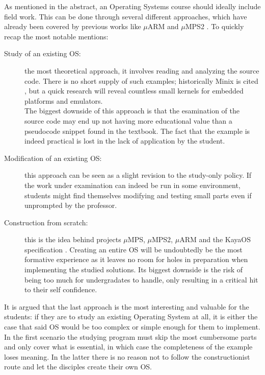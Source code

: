 \documentclass[12pt,a4paper,openright,twoside]{report}
\begin{document}
As mentioned in the abstract, an Operating Systems course should ideally include
field work. This can be done through several different approaches, which
have already been covered by previous works like $\mu$ARM and $\mu$MPS2
\cite{tesijonjic} \cite{tesimelletti}.
To quickly recap the most notable mentions:
\begin{description}
    \item[Study of an existing OS:] the most theoretical approach, it involves
        reading and analyzing the source code. There is no short supply of such
        examples; historically Minix is cited \cite{minix}, but a quick research
        will reveal countless small kernels for embedded platforms and emulators.\\
        The biggest downside of this approach is that the esamination of the source
        code may end up not having more educational value than a pseudocode snippet
        found in the textbook. The fact that the example is indeed practical is 
        lost in the lack of application by the student.
    \item[Modification of an existing OS:] this approach can be seen as a slight
        revision to the study-only policy. If the work under examination can indeed
        be run in some environment, students might find themselves modifying 
        and testing small parts even if unprompted by the professor.
    \item[Construction from scratch:] this is the idea behind projects $\mu$MPS, 
        $\mu$MPS2, $\mu$ARM and the KayaOS specification \cite{davolimorsiani}.
        Creating an entire OS will be undoubtedly be the most formative experience
        as it leaves no room for holes in preparation when implementing the
        studied solutions. Its biggest downside is the risk of being too much
        for undergradates to handle, only resulting in a critical hit to their
        self confidence.
\end{description}

It is argued that the last approach is the most interesting and valuable for 
the students: if they are to study an existing Operating System at all, it is
either the case that said OS would be too complex or simple enough for them 
to implement. In the first scenario the studying program must skip the most cumbersome
parts and only cover what is essential, in which case the completeness 
of the example loses meaning. In the latter there is no reason not to follow 
the constructionist route and let the disciples create their own OS.
\end{document}
